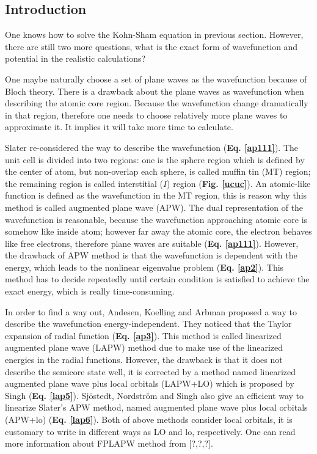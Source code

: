 \documentclass[a4paper, 12pt, titlepage,oneside,drop]{kthesis}
\begin{document}
\subsection{Introduction}

One knows how to solve the Kohn-Sham equation in previous section. However, there are still two more questions, what is the exact form of 
wavefunction and potential in the realistic calculations?  

One maybe naturally choose a set of plane waves as the wavefunction because of Bloch theory. There is a drawback about the plane waves as wavefunction
when describing the atomic core region. Because the wavefunction change dramatically in that region, therefore one needs to choose relatively more plane
waves to approximate it. It implies it will take more time to calculate.

Slater re-considered the way to describe the wavefunction (\textbf{Eq. \ref{ap111}}). The unit cell is divided into two regions: one is the sphere region which is
defined by the center of atom, but non-overlap each sphere, is called muffin tin (MT) region; the remaining region is called interstitial ($I$)
region (\textbf{Fig. \ref{ucuc}}). An atomic-like function is defined as the wavefunction in the MT region, this is reason why this method is called augmented plane wave (APW).
The dual representation of the wavefunction is reasonable, because the wavefunction approaching atomic core is somehow like inside atom; however far away the atomic core, the electron behaves like free electrons,
therefore plane waves are suitable (\textbf{Eq. \ref{ap111}}). However, the drawback of APW method is that the wavefunction is dependent with the energy, which leads to the 
nonlinear eigenvalue problem (\textbf{Eq. \ref{ap2}}). This method has to decide repeatedly until certain condition is satisfied to achieve the exact energy, which is really time-consuming.

In order to find a way out, Andesen, Koelling and Arbman proposed a way to describe the wavefunction energy-independent.
They noticed that the Taylor expansion of radial function (\textbf{Eq. \ref{ap3}}). This method is called linearized augmented plane wave (LAPW) method due to make use of the linearized energies in the radial functions. 
However, the drawback is that it does not describe the semicore state well, it is corrected by a method named linearized augmented plane wave plus local orbitals (LAPW+LO) which is proposed by Singh (\textbf{Eq. \ref{lap5}}).
Sjöstedt, Nordström and Singh also give an efficient way to linearize Slater's APW method, named augmented plane wave plus local orbitals (APW+lo) (\textbf{Eq. \ref{lap6}}). Both of above methods consider local orbitals, 
it is customary to write in different ways as LO and lo, respectively. One can read more information about FPLAPW method from [?,?,?].
\end{document}
